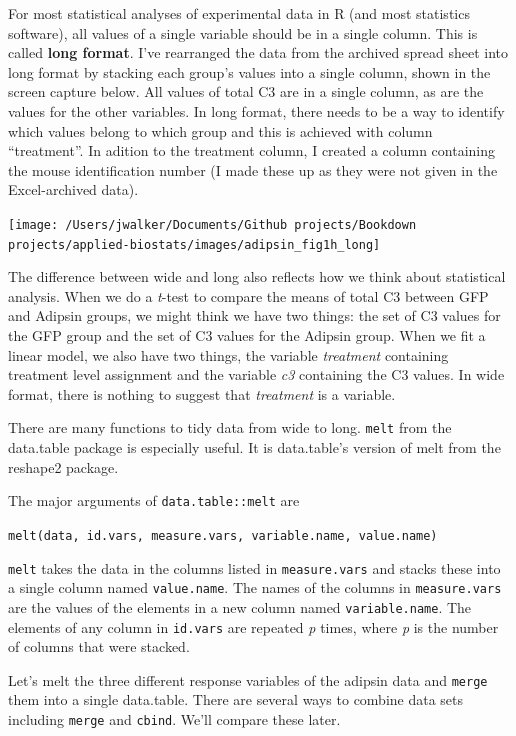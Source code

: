 \documentclass[]{book}
\begin{document}
For most statistical analyses of experimental data in R (and most statistics software), all values of a single variable should be in a single column. This is called \textbf{long format}. I've rearranged the data from the archived spread sheet into long format by stacking each group's values into a single column, shown in the screen capture below. All values of total C3 are in a single column, as are the values for the other variables. In long format, there needs to be a way to identify which values belong to which group and this is achieved with column ``treatment''. In adition to the treatment column, I created a column containing the mouse identification number (I made these up as they were not given in the Excel-archived data).

\texttt{[image: /Users/jwalker/Documents/Github projects/Bookdown projects/applied-biostats/images/adipsin\_fig1h\_long]}

The difference between wide and long also reflects how we think about statistical analysis. When we do a \emph{t}-test to compare the means of total C3 between GFP and Adipsin groups, we might think we have two things: the set of C3 values for the GFP group and the set of C3 values for the Adipsin group. When we fit a linear model, we also have two things, the variable \emph{treatment} containing treatment level assignment and the variable \emph{c3} containing the C3 values. In wide format, there is nothing to suggest that \emph{treatment} is a variable.

There are many functions to tidy data from wide to long. \texttt{melt} from the data.table package is especially useful. It is data.table's version of melt from the reshape2 package.

The major arguments of \texttt{data.table::melt} are

\texttt{melt(data,\ id.vars,\ measure.vars,\ variable.name,\ value.name)}

\texttt{melt} takes the data in the columns listed in \texttt{measure.vars} and stacks these into a single column named \texttt{value.name}. The names of the columns in \texttt{measure.vars} are the values of the elements in a new column named \texttt{variable.name}. The elements of any column in \texttt{id.vars} are repeated \emph{p} times, where \emph{p} is the number of columns that were stacked.

Let's melt the three different response variables of the adipsin data and \texttt{merge} them into a single data.table. There are several ways to combine data sets including \texttt{merge} and \texttt{cbind}. We'll compare these later.
\end{document}
